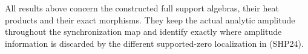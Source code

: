 All results above concern the constructed full support
algebras, their heat products and their exact morphisms.
They keep the actual analytic amplitude throughout
the synchronization map and identify exactly where
amplitude information is discarded by the different
supported-zero localization in (SHP24).
